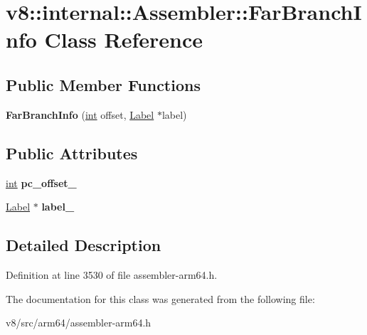 \hypertarget{classv8_1_1internal_1_1Assembler_1_1FarBranchInfo}{}\section{v8\+:\+:internal\+:\+:Assembler\+:\+:Far\+Branch\+Info Class Reference}
\label{classv8_1_1internal_1_1Assembler_1_1FarBranchInfo}
\subsection*{Public Member Functions}
\begin{DoxyCompactItemize}
\item 
\mbox{\label{classv8_1_1internal_1_1Assembler_1_1FarBranchInfo_adef504b379b0f0bbedb03c63f908b13d}} 
{\bfseries Far\+Branch\+Info} (\mbox{\hyperlink{classint}{int}} offset, \mbox{\hyperlink{classv8_1_1internal_1_1Label}{Label}} $\ast$label)
\end{DoxyCompactItemize}
\subsection*{Public Attributes}
\begin{DoxyCompactItemize}
\item 
\mbox{\label{classv8_1_1internal_1_1Assembler_1_1FarBranchInfo_a0979e2ec5fa8ea1085dfe292662c63bc}} 
\mbox{\hyperlink{classint}{int}} {\bfseries pc\+\_\+offset\+\_\+}
\item 
\mbox{\label{classv8_1_1internal_1_1Assembler_1_1FarBranchInfo_ad4ab8af8b7eefa485b2bdeab89ae5ab2}} 
\mbox{\hyperlink{classv8_1_1internal_1_1Label}{Label}} $\ast$ {\bfseries label\+\_\+}
\end{DoxyCompactItemize}


\subsection{Detailed Description}


Definition at line 3530 of file assembler-\/arm64.\+h.



The documentation for this class was generated from the following file\+:\begin{DoxyCompactItemize}
\item 
v8/src/arm64/assembler-\/arm64.\+h\end{DoxyCompactItemize}
